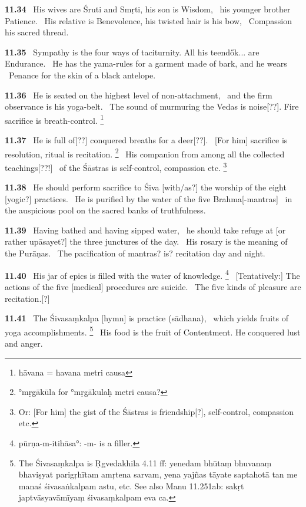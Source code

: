 \documentclass{article}
\begin{document}
\textbf{11.34}%
\ His wives are Śruti and Smṛti, his son is Wisdom,%
\              his younger brother Patience.%
\ His relative is Benevolence, his twisted hair is his bow,%
\                                  Compassion his sacred thread.%


\textbf{11.35}%
\ Sympathy is the four ways of taciturnity. All his teendők... are Endurance.%
\ He has the yama-rules for a garment made of bark, and he wears%
\               Penance for the skin of a black antelope.%


\textbf{11.36}%
\ He is seated on the highest level of non-attachment,%
\               and the firm observance is his yoga-belt.%
\ The sound of murmuring the Vedas is noise[??]. Fire sacrifice is breath-control.%
\footnote{hāvana = havana metri causa }%


\textbf{11.37}%
\ He is full of[??] conquered breaths for a deer[??].%
\              [For him] sacrifice is resolution, ritual is recitation.%
\footnote{°mṛgākūla for °mṛgākulaḥ metri causa? }%
\ His companion from among all the collected teachings[??!]%
\              of the Śāstras is self-control, compassion etc.%
\footnote{Or: [For him] the gist of the Śāstras is friendship[?], self-control, compassion etc. }%


\textbf{11.38}%
\ He should perform sacrifice to Śiva [with/as?] the worship of the eight [yogic?] practices.%
\ He is purified by the water of the five Brahma[-mantras]%
\              in the auspicious pool on the sacred banks of truthfulness.%


\textbf{11.39}%
\ Having bathed and having sipped water,%
\              he should take refuge at [or rather upāsayet?] the three junctures of the day.%
\ His rosary is the meaning of the Purāṇas.%
\              The pacification of mantras? is? recitation day and night.%


\textbf{11.40}%
\ His jar of epics is filled with the water of knowledge.%
\footnote{pūrṇa-m-itihāsa°: -m- is a filler. }%
\ [Tentatively:] The actions of the five [medical] procedures are suicide.%
\                                 The five kinds of pleasure are recitation.[?]%


\textbf{11.41}%
\ The Śivasaṃkalpa [hymn] is practice (sādhana),%
\                      which yields fruits of yoga accomplishments.%
\footnote{The Śivasaṃkalpa is Ṛgvedakhila 4.11 ff:        yenedam bhūtaṃ bhuvanaṃ bhaviṣyat parigṛhītam amṛtena sarvam,        yena yajñas tāyate saptahotā tan me manaś śivasaṅkalpam astu, etc.         See also Manu 11.251ab: sakṛt japtvāsyavāmīyaṃ śivasaṃkalpam eva ca. }%
\ His food is the fruit of Contentment. He conquered lust and anger.%
\end{document}
